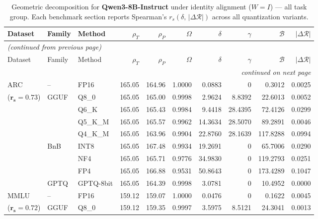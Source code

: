 \begingroup
\small
\setlength{\tabcolsep}{4pt}
\renewcommand{\arraystretch}{1.05}
\setlength{\LTcapwidth}{\textwidth}
\begin{longtable}{ll l rrrrrrr}
\caption{Geometric decomposition for \textbf{Qwen3-8B-Instruct} under identity alignment ($W{=}I$) --- all task group. Each benchmark section reports Spearman's $r_s(\delta,\,|\Delta\mathcal{R}|)$ across all quantization variants.}\label{tab:qwen_instruct_decomposition_all}\\
\toprule
Dataset & Family & Method & $\rho_T$ & $\rho_P$ & $\Omega$ & $\delta$ & $\gamma$ & $\mathcal{B}$ & $|\Delta\mathcal{R}|$ \\
\midrule
\endfirsthead
\multicolumn{10}{l}{\small\itshape (continued from previous page)}\\
\toprule
Dataset & Family & Method & $\rho_T$ & $\rho_P$ & $\Omega$ & $\delta$ & $\gamma$ & $\mathcal{B}$ & $|\Delta\mathcal{R}|$ \\
\midrule
\endhead
\midrule
\multicolumn{10}{r}{\small\itshape continued on next page}\\
\endfoot
\bottomrule
\endlastfoot
ARC & -- & FP16 & 165.05 & 164.96 & 1.0000 & 0.0883 & \cellcolor{cyan!12} $0$ & 0.3012 & 0.0025 \\
{\small ($\mathbf{r_s{=}0.73}$)} & GGUF & Q8\_0 & 165.05 & 165.00 & 0.9998 & 2.9624 & 8.8392 & 22.6013 & 0.0052 \\
 &  & Q6\_K & 165.05 & 165.43 & 0.9984 & 9.4418 & 28.4395 & 72.4126 & 0.0299 \\
 &  & Q5\_K\_M & 165.05 & 165.57 & 0.9962 & 14.3634 & 28.5070 & 89.2891 & 0.0046 \\
 &  & Q4\_K\_M & 165.05 & 163.96 & 0.9904 & 22.8760 & 28.1639 & 117.8288 & 0.0994 \\
 & BnB & INT8 & 165.05 & 167.48 & 0.9934 & 19.2691 & \cellcolor{cyan!12} $0$ & 65.7006 & 0.0290 \\
 &  & NF4 & 165.05 & 165.71 & 0.9776 & 34.9830 & \cellcolor{cyan!12} $0$ & 119.2793 & 0.0251 \\
 &  & FP4 & 165.05 & 166.88 & 0.9531 & 50.8643 & \cellcolor{cyan!12} $0$ & 173.4289 & 0.1047 \\
 & GPTQ & GPTQ-8bit & 165.05 & 164.39 & 0.9998 & 3.0781 & \cellcolor{cyan!12} $0$ & 10.4952 & 0.0000 \\
\midrule
MMLU & -- & FP16 & 159.12 & 159.07 & 1.0000 & 0.0476 & \cellcolor{cyan!12} $0$ & 0.1622 & 0.0045 \\
{\small ($\mathbf{r_s{=}0.72}$)} & GGUF & Q8\_0 & 159.12 & 159.35 & 0.9997 & 3.5975 & 8.5121 & 24.3041 & 0.0013 \\

\end{longtable}
